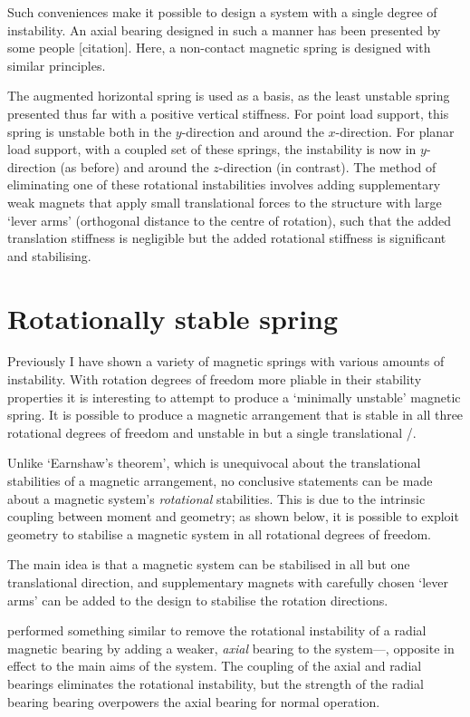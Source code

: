Such conveniences make it possible to design a system with a single
degree of instability. An axial bearing designed in such a manner has
been presented by some people [citation]. Here, a non-contact magnetic
spring is designed with similar principles.

The augmented horizontal spring is used as a basis, as the least
unstable spring presented thus far with a positive vertical
stiffness. For point load support, this spring is unstable both in the
$y$-direction and around the $x$-direction. For planar load support,
with a coupled set of these springs, the instability is now in $y$-direction
(as before) and around the $z$-direction (in contrast). The
method of eliminating one of these rotational instabilities involves
adding supplementary weak magnets that apply small translational
forces to the structure with large `lever arms' (orthogonal distance
to the centre of rotation), such that the added translation stiffness
is negligible but the added rotational stiffness is significant and
stabilising.


\section{Rotationally stable spring}

Previously I have shown a variety of magnetic springs with various
amounts of instability. With rotation degrees of freedom more pliable
in their stability properties it is interesting to attempt to produce
a `minimally unstable' magnetic spring. It is possible to produce a
magnetic arrangement that is stable in all three rotational degrees of
freedom and unstable in but a single translational \dof/.

Unlike `Earnshaw's theorem', which is unequivocal about the
translational stabilities of a magnetic arrangement, no conclusive
statements can be made about a magnetic system's \emph{rotational}
stabilities. This is due to the intrinsic coupling between moment and
geometry; as shown below, it is possible to exploit geometry to
stabilise a magnetic system in all rotational degrees of freedom.

The main idea is that a magnetic system can be
stabilised in all but one translational direction, and
supplementary magnets with carefully chosen `lever arms' can be added to the design to stabilise the
rotation directions.

\textcite{delamare1994} performed something similar to remove the
rotational instability of a radial magnetic bearing by adding a
weaker, \emph{axial} bearing to the system—\ie, opposite in effect
to the main aims of the system. The coupling of the axial and radial
bearings eliminates the rotational instability, but the strength of
the radial bearing bearing overpowers the axial bearing for normal
operation.

